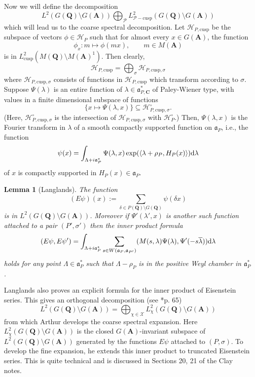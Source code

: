 \documentclass[11pt]{amsart}
\def\A{\mathbf A}
\def\C{\mathbf C}
\def\Q{\mathbf Q}
\def\HHH{\mathcal H}
\def\PPP{\mathcal P}
\def\XXX{\mathcal X}
\def\aaa{\mathfrak a}
\def\d{\text d}
\def\bs{\setminus}
\def\cusp{\text{cusp}}
\def\Ltwo{L^2}
\def\sprod#1#2{\left\langle #1 , #2 \right\rangle}  %
\newtheorem{lemma}[theorem]{Lemma}
\theoremstyle{remark}
\begin{document}
Now we will define the decomposition
\[ \Ltwo(G(\Q)\bs G(\A)) \bigoplus_\PPP \Ltwo_{\PPP-\cusp}(G(\Q)\bs G(\A)) \]
which will lead us to the coarse spectral decomposition. Let $\HHH_{P, \cusp}$ be the subspace of vectors $\phi \in \HHH_P$ such that for almost every $x \in G(\A)$, the function
\[ \phi_x : m \mapsto \phi(mx) , \qquad m \in M(\A) \]
is in $\Ltwo_{\cusp}(M(\Q)\bs M(\A)^1)$. Then clearly,
\[ \HHH_{P, \cusp} = \bigoplus_\sigma \HHH_{P, \cusp, \sigma} \]
where $\HHH_{P, \cusp, \sigma}$ consists of functions in $\HHH_{P, \cusp}$ which transform according to $\sigma$. Suppose $\Psi(\lambda)$ is an entire function of $\lambda \in \aaa_{P, \C}^*$ of Paley-Wiener type, with values in a finite dimensional subspace of functions
\[ \{ x \mapsto \Psi(\lambda, x) \} \subseteq \HHH_{P, \cusp, \sigma}^\circ. \]
(Here, $\HHH_{P, \cusp, \sigma}^\circ$ is the intersection of $\HHH_{P, \cusp, \sigma}$ with $\HHH_P^\circ$.) Then, $\Psi(\lambda, x)$ is the Fourier transform in $\lambda$ of a smooth compactly supported function on $\aaa_P$, i.e., the function
\[ \psi(x) = \int_{\Lambda + i\aaa_P^*} \Psi(\lambda, x) \exp(\sprod{\lambda + \rho_P}{H_P(x)}) \d \lambda \]
of $x$ is compactly supported in $H_P(x) \in \aaa_P$. 
\begin{lemma} [Langlands]
	The function 
	\[ (E\psi)(x) := \sum_{\delta \in P(\Q)\bs G(\Q)} \psi(\delta x) \]
	is in $\Ltwo(G(\Q)\bs G(\A))$. Moreover if $\Psi'(\lambda', x)$ is another such function attached to a pair $(P', \sigma')$ then the inner product formula
	\[ (E\psi, E\psi') = \int_{\Lambda + i\aaa_P^*} \sum_{s \in W(\aaa_P, \aaa_{P'})}
				(M(s, \lambda)\Psi(\lambda), \Psi'(-s\overline \lambda)) \d \lambda \]
	holds for any point $\Lambda \in \aaa_P^*$ such that $\Lambda - \rho_P$ is in the positive Weyl chamber in $\aaa_P^*$. 
\end{lemma}

Langlands also proves an explicit formula for the inner product of Eisenstein series. This gives an orthogonal decomposition (see \cite{clay}*{p. 65})
\begin{equation} \label{hpchi}
	\Ltwo(G(\Q)\bs G(\A)) = \bigoplus_{\chi \in \XXX} \Ltwo_\chi(G(\Q)\bs G(\A))
\end{equation}
from which Arthur develops the coarse spectral expansion. Here $\Ltwo_\chi(G(\Q)\bs G(\A))$ is the closed $G(\A)$-invariant subspace of $\Ltwo(G(\Q)\bs G(\A))$ generated by the functions $E\psi$ attached to $(P, \sigma)$. To develop the fine expansion, he extends this inner product to truncated Eisenstein series. This is quite technical and is discussed in Sections 20, 21 of the Clay notes. 
\end{document}
